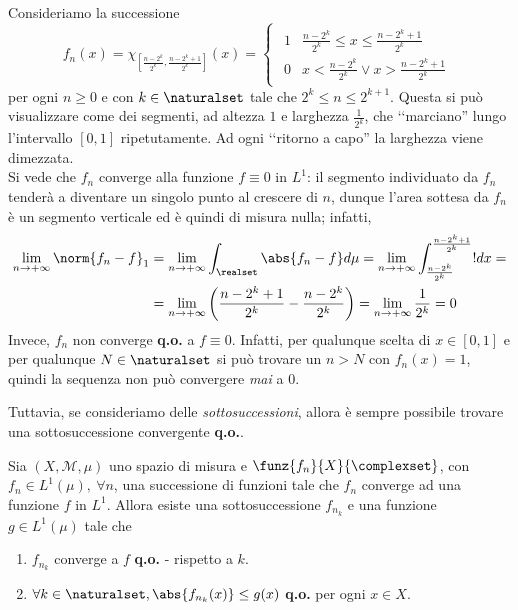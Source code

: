 \begin{examplewt}
		Consideriamo la successione
	\begin{equation*}
		f_n(x)=\chi_{\left[\frac{n-2^k}{2^k},\frac{n-2^k+1}{2^k}\right]}(x)=
		\begin{cases}
			\begin{array}{ll}
				1&\frac{n-2^k}{2^k}\leq x\leq\frac{n-2^k+1}{2^k}\\
				0&x< \frac{n-2^k}{2^k}\vee x>\frac{n-2^k+1}{2^k}
			\end{array}
		\end{cases}
	\end{equation*}
	per ogni $n\geq 0$ e con $k\in\naturalset$ tale che $2^k\leq n\leq 2^{k+1}$. Questa si può visualizzare come dei segmenti, ad altezza $1$ e larghezza $\frac{1}{2^k}$, che ‘‘marciano'' lungo l'intervallo $\left[0,1\right]$ ripetutamente. Ad ogni ‘‘ritorno a capo'' la larghezza viene dimezzata.\\
	Si vede che $f_n$ converge alla funzione $f\equiv 0$ in $L^1$: il segmento individuato da $f_n$ tenderà a diventare un singolo punto al crescere di $n$, dunque l'area sottesa da $f_n$ è un segmento verticale ed è quindi di misura nulla; infatti,
	\begin{align*}
		\lim_{n\to+\infty}\norm{f_n-f}_1&=\lim_{n\to+\infty}\int_{\realset}\abs{f_n-f}d\mu = \lim_{n\to+\infty}\int_{\frac{n-2^k}{2^k}}^{\frac{n-2^k+1}{2^k}}!dx = \\
		& = \lim_{n\to+\infty}\left(\frac{n-2^k+1}{2^k}-\frac{n-2^k}{2^k}\right) = \lim_{n\to+\infty}\frac{1}{2^k}=0
	\end{align*}
	Invece, $f_n$ non converge \textbf{q.o.} a $f\equiv 0$. Infatti, per qualunque scelta di $x\in\left[0,1\right]$ e per qualunque $N\in\naturalset$ si può trovare un $n>N$ con $f_n(x)=1$, quindi la sequenza non può convergere \textit{mai} a $0$.
\end{examplewt}
Tuttavia, se consideriamo delle \textit{sottosuccessioni}, allora è sempre possibile trovare una sottosuccessione convergente \textbf{q.o.}.
\begin{theoremaqed}
	Sia $\left(X,\mathcal{M},\mu\right)$ uno spazio di misura e $\funz{f_n}{X}{\complexset}$, con $f_n\in L^1(\mu),\ \forall n$, una successione di funzioni tale che $f_n$ converge ad una funzione $f$ in $L^1$. Allora esiste una sottosuccessione $f_{n_k}$ e una funzione $g\in L^1(\mu)$ tale che
	\begin{enumerate}
		\item $f_{n_k}$ converge a $f$ \textbf{q.o.} - rispetto a $k$.
		\item $\forall k\in\naturalset,\abs{f_{n_k}(x)}\leq g(x)$ \textbf{q.o.} per ogni $x\in X$.\qedhere
	\end{enumerate} 
\end{theoremaqed}
